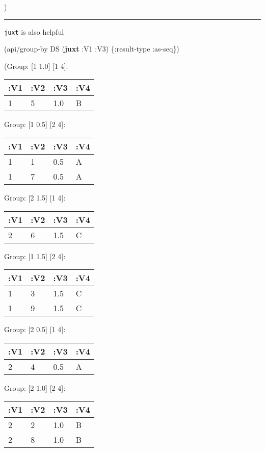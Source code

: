 \documentclass[]{article}
\newenvironment{Shaded}{\begin{snugshade}}{\end{snugshade}}
\newcommand{\AttributeTok}[1]{\textcolor[rgb]{0.77,0.63,0.00}{#1}}
\newcommand{\KeywordTok}[1]{\textcolor[rgb]{0.13,0.29,0.53}{\textbf{#1}}}
\newcommand{\NormalTok}[1]{#1}
\begin{document}
)

\begin{center}\rule{0.5\linewidth}{0.5pt}\end{center}

\texttt{juxt} is also helpful

\begin{Shaded}
\begin{Highlighting}[]
\NormalTok{(api/group-by DS (}\KeywordTok{juxt} \AttributeTok{:V1} \AttributeTok{:V3}\NormalTok{) \{}\AttributeTok{:result-type} \AttributeTok{:as-seq}\NormalTok{\})}
\end{Highlighting}
\end{Shaded}

(Group: {[}1 1.0{]} {[}1 4{]}:

\begin{longtable}[]{@{}llll@{}}
\toprule
:V1 & :V2 & :V3 & :V4\tabularnewline
\midrule
\endhead
1 & 5 & 1.0 & B\tabularnewline
\bottomrule
\end{longtable}

Group: {[}1 0.5{]} {[}2 4{]}:

\begin{longtable}[]{@{}llll@{}}
\toprule
:V1 & :V2 & :V3 & :V4\tabularnewline
\midrule
\endhead
1 & 1 & 0.5 & A\tabularnewline
1 & 7 & 0.5 & A\tabularnewline
\bottomrule
\end{longtable}

Group: {[}2 1.5{]} {[}1 4{]}:

\begin{longtable}[]{@{}llll@{}}
\toprule
:V1 & :V2 & :V3 & :V4\tabularnewline
\midrule
\endhead
2 & 6 & 1.5 & C\tabularnewline
\bottomrule
\end{longtable}

Group: {[}1 1.5{]} {[}2 4{]}:

\begin{longtable}[]{@{}llll@{}}
\toprule
:V1 & :V2 & :V3 & :V4\tabularnewline
\midrule
\endhead
1 & 3 & 1.5 & C\tabularnewline
1 & 9 & 1.5 & C\tabularnewline
\bottomrule
\end{longtable}

Group: {[}2 0.5{]} {[}1 4{]}:

\begin{longtable}[]{@{}llll@{}}
\toprule
:V1 & :V2 & :V3 & :V4\tabularnewline
\midrule
\endhead
2 & 4 & 0.5 & A\tabularnewline
\bottomrule
\end{longtable}

Group: {[}2 1.0{]} {[}2 4{]}:

\begin{longtable}[]{@{}llll@{}}
\toprule
:V1 & :V2 & :V3 & :V4\tabularnewline
\midrule
\endhead
2 & 2 & 1.0 & B\tabularnewline
2 & 8 & 1.0 & B\tabularnewline
\bottomrule
\end{longtable}
\end{document}
